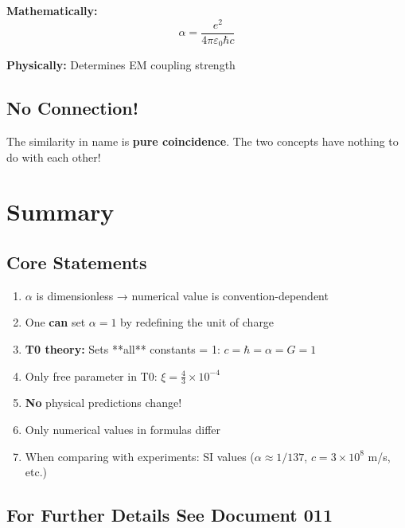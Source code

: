 	\textbf{Mathematically:}
	\begin{equation}
		\alpha = \frac{e^2}{4\pi\varepsilon_0\hbar c}
	\end{equation}
	
	\textbf{Physically:} Determines EM coupling strength
	
	\subsection{No Connection!}
	
	The similarity in name is \textbf{pure coincidence}. The two concepts have nothing to do with each other!
	
	\section{Summary}
	
	\subsection{Core Statements}
	
	\begin{enumerate}
		\item $\alpha$ is dimensionless → numerical value is convention-dependent
		
		\item One \textbf{can} set $\alpha = 1$ by redefining the unit of charge
		
		\item \textbf{T0 theory:} Sets **all** constants = 1: $c = \hbar = \alpha = G = 1$
		
		\item Only free parameter in T0: $\xi = \frac{4}{3} \times 10^{-4}$
		
		\item \textbf{No} physical predictions change!
		
		\item Only numerical values in formulas differ
		
		\item When comparing with experiments: SI values ($\alpha \approx 1/137$, $c = 3 \times 10^8$ m/s, etc.)
	\end{enumerate}
	
	\subsection{For Further Details See Document 011}
	
